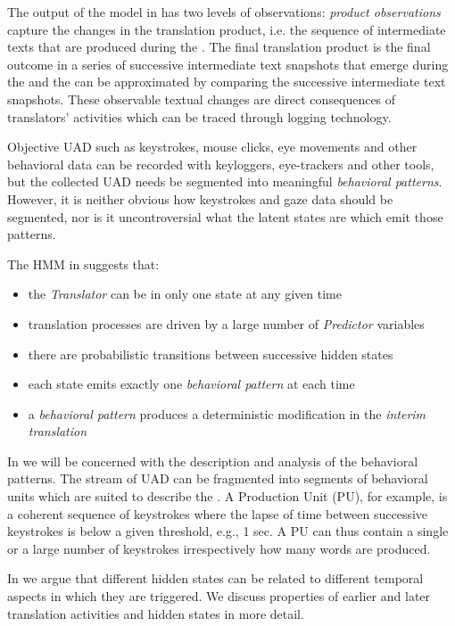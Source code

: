 \documentclass[output=paper]{LSP/langsci}
\begin{document}
 
The output of the model in  has two levels of observations: \textit{product observations} capture the changes in the translation product, i.e. the sequence of intermediate texts that are produced during the . The final translation product is the final outcome in a series of successive intermediate text snapshots that emerge during the  and the  can be approximated by comparing the successive intermediate text snapshots. These observable textual changes are direct consequences of translators' activities which can be traced through logging technology.

Objective UAD such as keystrokes, mouse clicks, eye movements and other behavioral data can be recorded with keyloggers, eye-trackers and other tools, but  the collected UAD needs be segmented into meaningful \textit{behavioral patterns}. However, it is neither obvious how keystrokes and gaze data should be segmented, nor is it uncontroversial what the latent states are which emit those patterns.

The HMM in  suggests that:
\begin{itemize}
\item the \textit{Translator} can be in only one state at any given time
\item translation processes are driven by a large number of \textit{Predictor} variables
\item there are probabilistic transitions between successive hidden states 
\item each state emits exactly one \textit{behavioral pattern} at each time
\item a \textit{behavioral pattern} produces a deterministic modification in the \textit{interim translation}
\end{itemize}

In  we will be concerned with the description and analysis of the behavioral patterns. The stream of UAD can be fragmented into segments of behavioral units which are suited to describe the . A Production Unit (PU), for example, is a coherent sequence of keystrokes where the lapse of time between successive keystrokes is below a given threshold, e.g., 1 sec. A PU can thus contain a single or a large number of keystrokes irrespectively how many words are produced. 

In  we argue that different hidden states can be related to different temporal aspects in which they are triggered. We discuss properties of earlier and later translation activities and hidden states in more detail.
\end{document}
